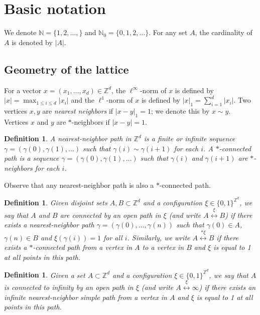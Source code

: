 \documentclass[a4paper,12pt]{article}
\newtheorem  {definition}    [theorem]{Definition}
\newcommand{\Z}{\mathbb{Z}}
\begin{document}
\section{Basic notation}
\label{s:notation}

We denote $\mathbb{N}=\{1,2,\dots,\}$ and $\mathbb{N}_0=\{0,1,2,\dots\}$. For any set $A$, the cardinality of $A$ is denoted by $|A|$.

\subsection{Geometry of the lattice}




For a vector $x=(x_1,\dots,x_d) \in \mathbb{Z}^d$, the $\ell^\infty$-norm of $x$ is defined by $|x|=\max_{1 \leq i \leq d} |x_i| $ and the $\ell^1$-norm of $x$ is defined by $|x|_1=\sum_{i=1}^d |x_i|$. Two vertices $x,y$ are \textit{ nearest neighbors} if $|x-y|_1 = 1$; we denote this by $x \sim y$. Vertices $x$ and $y$ are $*$-neighbors if $|x-y| = 1$.

\begin{definition}\label{def_paths}
A \textit{nearest-neighbor} path in $\Z^d$ is a finite or infinite sequence $\gamma = (\gamma(0),\gamma(1),\ldots)$ such that $\gamma(i)\sim \gamma(i+1)$ for each $i$. A \textit{$*$-connected path} is a sequence $\gamma = (\gamma(0), \gamma(1),\ldots)$ such that $\gamma(i)$ and $\gamma(i+1)$ are $*$-neighbors for each $i$.
\end{definition}
Observe that any nearest-neighbor path is also a $*$-connected path.

\begin{definition}\label{def_connected_in_a_config}
Given disjoint sets $A, B \subset \Z^d$ and a configuration $\xi \in \{0,1\}^{\Z^d}$, we say that $A$ and $B$ are connected by an \emph{open} path in $\xi$ (and write $A \stackrel{\xi}{\longleftrightarrow} B$) if there exists a nearest-neighbor path $\gamma = (\gamma(0), \ldots, \gamma(n))$ such that $\gamma(0) \in A$, $\gamma(n) \in B$ and $\xi(\gamma(i)) = 1$ for all $i$. Similarly, we write $A\stackrel{*\xi}{\longleftrightarrow} B$ if there exists a $*$-connected path from a vertex in $A$ to a vertex in $B$ and $\xi$ is equal to 1 at all points in this path.
\end{definition}

\begin{definition}\label{def_connected_to_infty_in_a_config}
Given a set $A \subset \Z^d$ and a configuration $\xi \in \{0,1\}^{\Z^d}$, we say that $A$ is connected to infinity by an \emph{open} path in $\xi$ (and write $A \stackrel{\xi}{\longleftrightarrow} \infty$) if there exists an infinite nearest-neighbor simple path from a vertex in $A$ and $\xi$ is equal to 1 at all points in this path.
\end{definition}
\end{document}
